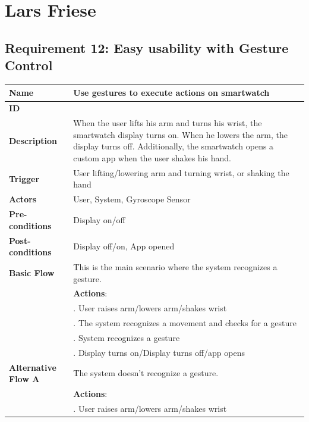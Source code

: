 \documentclass{article}
\begin{document}
\section{Lars Friese}
	\subsection{Requirement 12: Easy usability with Gesture Control}
		\vspace{1em}
			\begin{center}
			\small
			\begin{tabularx}{1.0\textwidth}{|>{\raggedright\arraybackslash}p{}|>{\raggedright\arraybackslash}X|}
				\hline
				\textbf{Name}               & Use gestures to execute actions on smartwatch \\ \hline
				\textbf{ID}                 & 12 \\ \hline
				\textbf{Description}        & When the user lifts his arm and turns his wrist, the smartwatch display turns on. When he lowers the arm, the display turns off. Additionally, the smartwatch opens a custom app when the user shakes his hand. \\ \hline
				\textbf{Trigger}            & User lifting/lowering arm and turning wrist, or shaking the hand \\ \hline
				\textbf{Actors}             & User, System, Gyroscope Sensor \\ \hline
				\textbf{Pre-conditions}     & Display on/off \\ \hline
				\textbf{Post-conditions}    & Display off/on, App opened \\ \hline
				\textbf{Basic Flow}         & This is the main scenario where the system recognizes a gesture. \\ \hline
											& \textbf{Actions}: \\
											& 1. User raises arm/lowers arm/shakes wrist \\
											& 2. The system recognizes a movement and checks for a gesture \\
											& 3. System recognizes a gesture \\
											& 4. Display turns on/Display turns off/app opens \\ \hline
				\textbf{Alternative Flow A} & The system doesn't recognize a gesture. \\ \hline
											& \textbf{Actions}: \\
											& 1. User raises arm/lowers arm/shakes wrist \\

\end{tabularx}
\end{center}
\end{document}
